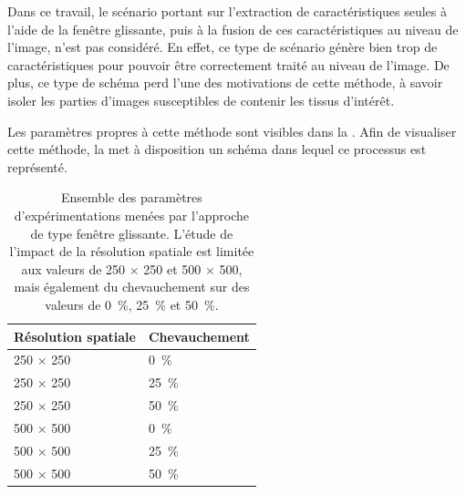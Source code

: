 Dans ce travail, le scénario portant sur l'extraction de caractéristiques seules à l'aide de la fenêtre glissante, puis à la fusion de ces caractéristiques au niveau de l'image, n'est pas considéré. En effet, ce type de scénario génère bien trop de caractéristiques pour pouvoir être correctement traité au niveau de l'image. De plus, ce type de schéma perd l'une des motivations de cette méthode, à savoir isoler les parties d'images susceptibles de contenir les tissus d'intérêt.\par
 
Les paramètres propres à cette méthode sont visibles dans la . Afin de visualiser cette méthode, la  met à disposition un schéma dans lequel ce processus est représenté.\par

\begin{table}[H]
    \centering
    \begin{tabular*}{0,6\linewidth}{l@{\extracolsep{\fill}}l}
        \toprule
        \textbf{Résolution spatiale}& \textbf{Chevauchement}\\ \hline
        250 $\times$ 250              & 0~\%                  \\ \hline
        250 $\times$ 250              & 25~\%                 \\ \hline
        250 $\times$ 250              & 50~\%                 \\ \hline 
        500 $\times$ 500              & 0~\%                  \\ \hline
        500 $\times$ 500              & 25~\%                 \\ \hline
        500 $\times$ 500              & 50~\%                 \\
        \bottomrule
    \end{tabular*}
    \caption{Ensemble des paramètres d'expérimentations menées par l'approche de type fenêtre glissante. L'étude de l'impact de la résolution spatiale est limitée aux valeurs de 250 $\times$ 250 et 500 $\times$ 500, mais également du chevauchement sur des valeurs de 0~\%, 25~\% et 50~\%.}
    \label{tab:parameters_image_improvement_sliding_window_parameters}
\end{table}\par

